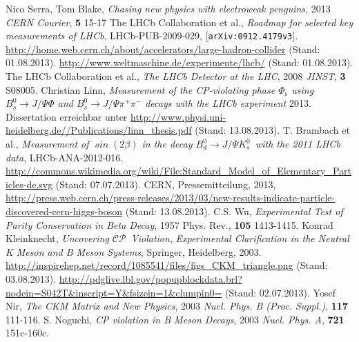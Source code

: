 \documentclass[ a4paper,
                12pt, 
                twoside, 
                chapterprefix, 
              ]{scrreprt}
\newcommand{\CP}{$\mathcal{CP}$}
\newcommand{\Decaychannel}{$B_d^0 \rightarrow J/\Psi K_s^0$}
\begin{document}

\pagestyle{headings}
\tableofcontents









\begin{thebibliography}{---}
 Nico Serra, Tom Blake, \textit{Chasing new physics with electroweak penguins}, 2013 \textit{CERN Courier}, \textbf{5} 15-17 
 The LHCb Collaboration et al., \textit{Roadmap for selected key measurements of LHCb}, LHCb-PUB-2009-029, [\texttt{arXiv:0912.4179v3}]. 
 \url{http://home.web.cern.ch/about/accelerators/large-hadron-collider} (Stand: 01.08.2013).
 \url{http://www.weltmaschine.de/experimente/lhcb/} (Stand: 01.08.2013).
 The LHCb Collaboration et al., \textit{The LHCb Detector at the LHC}, 2008 \textit{JINST}, \textbf{3} S08005.
 Christian Linn, \textit{Measurement of the CP-violating phase $\Phi_{\text{s}}$ using $B_s^0 \rightarrow J/\Psi\Phi$ and $B_s^0 \rightarrow J/\Psi\pi^+\pi^-$ decays with the LHCb experiment} 2013. Dissertation erreichbar unter \url{http://www.physi.uni-heidelberg.de//Publications/linn_thesis.pdf} (Stand: 13.08.2013).
 T. Brambach et al., \textit{Measurement of $\mathit{\sin(2\beta)}$ in the decay \Decaychannel\ with the 2011 LHCb data}, LHCb-ANA-2012-016.
 \url{http://commons.wikimedia.org/wiki/File:Standard_Model_of_Elementary_Particles-de.svg} (Stand: 07.07.2013).
 CERN, Pressemitteilung, 2013, \url{http://press.web.cern.ch/press-releases/2013/03/new-results-indicate-particle-discovered-cern-higgs-boson} (Stand: 13.08.2013).
 C.S. Wu, \textit{Experimental Test of Parity Conservation in Beta Decay}, 1957 Phys. Rev., \textbf{105} 1413-1415.
  Konrad Kleinknecht, \textit{Uncovering \CP\ Violation}, \textit{Experimental Clarification in the Neutral K Meson and B Meson Systems}, Springer, Heidelberg, 2003.
 \url{http://inspirehep.net/record/1085541/files/figs_CKM_triangle.png} (Stand: 03.08.2013).
 \url{http://pdglive.lbl.gov/popupblockdata.brl?nodein=S042T&inscript=Y&fsizein=1&clumpin0=} (Stand: 02.07.2013).
 Yosef Nir, \textit{The CKM Matrix and New Physics}, 2003 \textit{Nucl. Phys. B (Proc. Suppl.)}, \textbf{117} 111-116.
 S. Noguchi, \textit{CP violation in B Meson Decays}, 2003 \textit{Nucl. Phys. A}, \textbf{721} 151c-160c.

\end{thebibliography}
\end{document}
